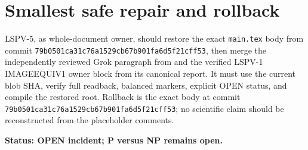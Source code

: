 \documentclass[11pt]{article}
\begin{document}
\section*{Smallest safe repair and rollback}
LSPV-5, as whole-document owner, should restore the exact
\texttt{main.tex} body from commit
\texttt{79b0501ca31c76a1529cb67b901fa6d5f21cff53}, then merge the independently
reviewed Grok paragraph from
 and the verified
LSPV-1 IMAGEEQUIV1 owner block from its canonical report.  It must use the
current blob SHA, verify full readback, balanced markers, explicit OPEN status,
and compile the restored root.  Rollback is the exact body at commit
\texttt{79b0501ca31c76a1529cb67b901fa6d5f21cff53}; no scientific claim should be
reconstructed from the placeholder comments.

\textbf{Status: OPEN incident; P versus NP remains open.}
\end{document}

